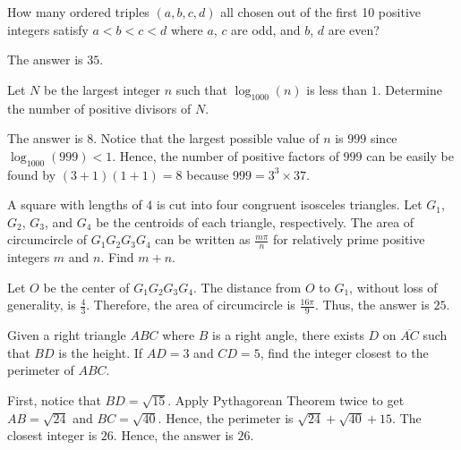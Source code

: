 \begin{problem}
How many ordered triples $(a,b,c,d)$ all chosen out of the first 10 positive integers satisfy $a<b<c<d$ where $a$, $c$ are odd, and $b$, $d$ are even?
\end{problem}

\begin{solution}
The answer is $35$.
\end{solution}

\begin{problem}
Let $N$ be the largest integer $n$ such that $\log_{1000}(n)$ is less than $1$. Determine the number of positive divisors of $N$.
\end{problem}

\begin{solution}
The answer is $8$. Notice that the largest possible value of $n$ is $999$ since $\log_{1000}(999) < 1$. Hence, the number of positive factors of $999$ can be easily be found by $(3+1)(1+1)=8$ because $999=3^3\times37$.
\end{solution}

\begin{problem}
A square with lengths of $4$ is cut into four congruent isosceles triangles. Let $G_1$, $G_2$, $G_3$, and $G_4$ be the centroids of each triangle, respectively. The area of circumcircle of $G_1G_2G_3G_4$ can be written as $\frac{m\pi}{n}$ for relatively prime positive integers $m$ and $n$. Find $m+n$.
\end{problem}

\begin{solution}
Let $O$ be the center of $G_1G_2G_3G_4$. The distance from $O$ to $G_1$, without loss of generality, is $\frac{4}{3}$. Therefore, the area of circumcircle is $\frac{16\pi}{9}$. Thus, the answer is $25$.
\end{solution}

\begin{problem}
Given a right triangle $ABC$ where $B$ is a right angle, there exists $D$ on $\overline{AC}$ such that $BD$ is the height. If $AD=3$ and $CD=5$, find the integer closest to the perimeter of $ABC$.
\end{problem}

\begin{solution}
First, notice that $BD=\sqrt{15}$. Apply Pythagorean Theorem twice to get $AB=\sqrt{24}$ and $BC=\sqrt{40}$. Hence, the perimeter is $\sqrt{24}+\sqrt{40}+15$. The closest integer is $26$. Hence, the answer is $26$.
\end{solution}

